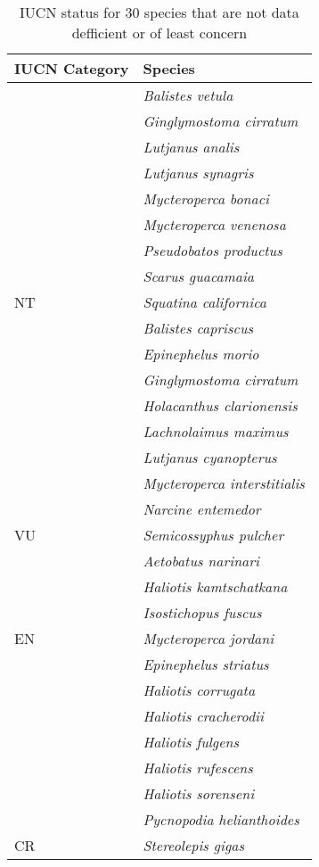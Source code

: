 \begin{table}

\caption{\label{tab:iucn}IUCN status for 30 species that are not data defficient or of least concern}
\centering
\begin{tabular}[t]{l>{}l}
\toprule
IUCN Category & Species\\
\midrule
 & \em{Balistes vetula}\\
\cmidrule{2-2}
 & \em{Ginglymostoma cirratum}\\
\cmidrule{2-2}
 & \em{Lutjanus analis}\\
\cmidrule{2-2}
 & \em{Lutjanus synagris}\\
\cmidrule{2-2}
 & \em{Mycteroperca bonaci}\\
\cmidrule{2-2}
 & \em{Mycteroperca venenosa}\\
\cmidrule{2-2}
 & \em{Pseudobatos productus}\\
\cmidrule{2-2}
 & \em{Scarus guacamaia}\\
\cmidrule{2-2}
\multirow{-9}{*}{\raggedright\arraybackslash NT} & \em{Squatina californica}\\
\cmidrule{1-2}
 & \em{Balistes capriscus}\\
\cmidrule{2-2}
 & \em{Epinephelus morio}\\
\cmidrule{2-2}
 & \em{Ginglymostoma cirratum}\\
\cmidrule{2-2}
 & \em{Holacanthus clarionensis}\\
\cmidrule{2-2}
 & \em{Lachnolaimus maximus}\\
\cmidrule{2-2}
 & \em{Lutjanus cyanopterus}\\
\cmidrule{2-2}
 & \em{Mycteroperca interstitialis}\\
\cmidrule{2-2}
 & \em{Narcine entemedor}\\
\cmidrule{2-2}
\multirow{-9}{*}{\raggedright\arraybackslash VU} & \em{Semicossyphus pulcher}\\
\cmidrule{1-2}
 & \em{Aetobatus narinari}\\
\cmidrule{2-2}
 & \em{Haliotis kamtschatkana}\\
\cmidrule{2-2}
 & \em{Isostichopus fuscus}\\
\cmidrule{2-2}
\multirow{-4}{*}{\raggedright\arraybackslash EN} & \em{Mycteroperca jordani}\\
\cmidrule{1-2}
 & \em{Epinephelus striatus}\\
\cmidrule{2-2}
 & \em{Haliotis corrugata}\\
\cmidrule{2-2}
 & \em{Haliotis cracherodii}\\
\cmidrule{2-2}
 & \em{Haliotis fulgens}\\
\cmidrule{2-2}
 & \em{Haliotis rufescens}\\
\cmidrule{2-2}
 & \em{Haliotis sorenseni}\\
\cmidrule{2-2}
 & \em{Pycnopodia helianthoides}\\
\cmidrule{2-2}
\multirow{-8}{*}{\raggedright\arraybackslash CR} & \em{Stereolepis gigas}\\
\bottomrule
\end{tabular}
\end{table}